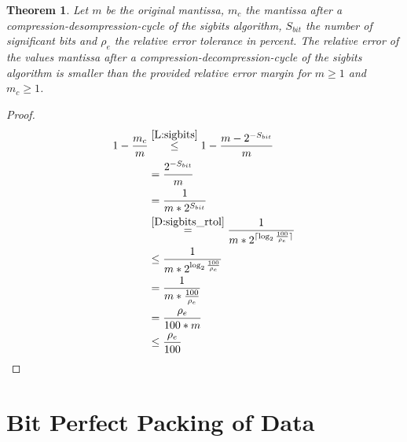 \documentclass[
	12pt,
	a4paper,
	BCOR10mm,
	DIV14,
	headsepline,
]{scrreprt}
\newtheorem{theorem}{Theorem}
\DeclarePairedDelimiter{\ceil}{\lceil}{\rceil}
\begin{document}
\clearpage

\begin{theorem} \label{T:sigbits}
	Let $m$ be the original mantissa, $m_c$ the mantissa after a
	compression-desompression-cycle of the sigbits algorithm, $S_{bit}$ the
	number of significant bits and $\rho_e$ the relative error tolerance in
	percent. The relative error of the values mantissa after a
	compression-decompression-cycle of the sigbits algorithm is smaller than
	the provided relative error margin for $m\ge 1$ and $m_c\ge 1$.
\end{theorem}

\begin{proof}
	\begingroup
	\addtolength{\jot}{1em}
	\begin{align*}
		1 - \frac{m_c}{m}
		&\stackrel{\ref{L:sigbits}}{\le}1 - \frac{m-2^{-S_{bit}}}{m} \\
	  	&=\frac{2^{-S_{bit}}}{m} \\
		&=\frac{1}{m * 2^{S_{bit}}} \\
	  	&\stackrel{\ref{D:sigbits_rtol}}{=}\frac{1}{m * 2^{
				\ceil{
					\log_2{\frac{100}{\rho_{e}}}
				}
			}} \\
	  	&\le \frac{1}{m * 2^{
				\log_2{\frac{100}{\rho_{e}}}
			}} \\
	  	&=\frac{1}{m * \frac{100}{\rho_{e}}} \\
		&=\frac{\rho_e}{100 * m} \\
	  	&\le \frac{\rho_e}{100} \qedhere
	\end{align*}
	\endgroup
\end{proof}

\chapter{Bit Perfect Packing of Data}
\label{bit_perf}

\bigskip
\end{document}
